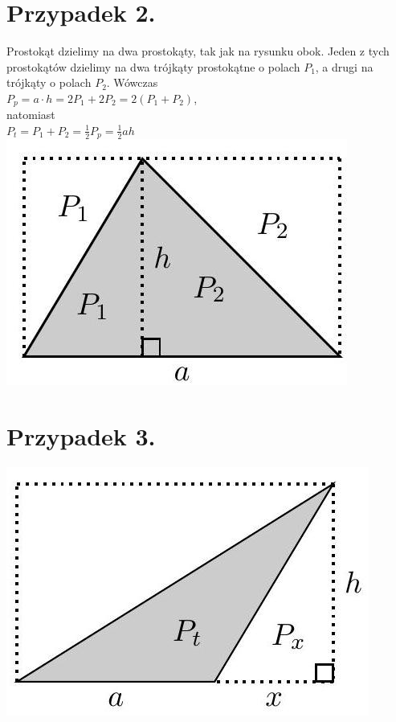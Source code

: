 \documentclass[10pt]{article}
\begin{document}
\section*{Przypadek 2.}
Prostokąt dzielimy na dwa prostokąty, tak jak na rysunku obok. Jeden z tych prostokątów dzielimy na dwa trójkąty prostokątne o polach \(P_{1}\), a drugi na trójkąty o polach \(P_{2}\). Wówczas\\
\(P_{p}=a \cdot h=2 P_{1}+2 P_{2}=2\left(P_{1}+P_{2}\right)\),\\
natomiast\\
\(P_{t}=P_{1}+P_{2}=\frac{1}{2} P_{p}=\frac{1}{2} a h\)\\
\includegraphics[max width=\textwidth, center]{2024_11_21_8f01584889ff06348ae7g-197(1)}

\section*{Przypadek 3.}
\begin{center}
\includegraphics[max width=\textwidth]{2024_11_21_8f01584889ff06348ae7g-197(2)}
\end{center}
\end{document}
